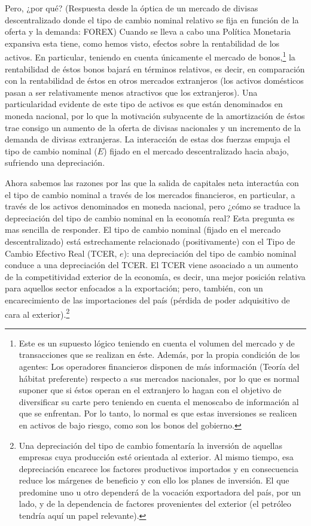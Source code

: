 \documentclass[10pt,a4paper]{article}
\begin{document}
Pero, ¿por qué? (Respuesta desde la óptica de un mercado de divisas descentralizado donde el tipo de cambio nominal relativo se fija en función de la oferta y la demanda: FOREX) Cuando se lleva a cabo una Política Monetaria expansiva esta tiene, como hemos visto, efectos sobre la rentabilidad de los activos. En particular, teniendo en cuenta únicamente el mercado de bonos,\footnote{%
    Este es un supuesto lógico teniendo en cuenta el volumen del mercado y de transacciones que se realizan en éste. Además, por la propia condición de los agentes: Los operadores financieros disponen de más información (Teoría del hábitat preferente) respecto a sus mercados nacionales, por lo que es normal suponer que si éstos operan en el extranjero lo hagan con el objetivo de diversificar su carte pero teniendo en cuenta el menoscabo de información al que se enfrentan. Por lo tanto, lo normal es que estas inversiones se realicen en activos de bajo riesgo, como son los bonos del gobierno.
} la rentabilidad de éstos bonos bajará en términos relativos, es decir, en comparación con la rentabilidad de éstos en otros mercados extranjeros (los activos domésticos pasan a ser relativamente menos atractivos que los extranjeros). Una particularidad evidente de este tipo de activos es que están denominados en moneda nacional, por lo que la motivación subyacente de la amortización de éstos trae consigo un aumento de la oferta de divisas nacionales y un incremento de la demanda de divisas extranjeras. La interacción de estas dos fuerzas empuja el tipo de cambio nominal ($E$) fijado en el mercado descentralizado hacia abajo, sufriendo una depreciación.

Ahora sabemos las razones por las que la salida de capitales neta interactúa con el tipo de cambio nominal a través de los mercados financieros, en particular, a través de los activos denominados en moneda nacional, pero ¿cómo se traduce la depreciación del tipo de cambio nominal en la economía real? Esta pregunta es mas sencilla de responder. El tipo de cambio nominal (fijado en el mercado descentralizado) está estrechamente relacionado (positivamente) con el Tipo de Cambio Efectivo Real (TCER, $e$): una depreciación del tipo de cambio nominal conduce a una depreciación del TCER. El TCER viene asoaciado a un aumento de la competitividad exterior de la economía, es decir, una mejor posición relativa para aquellos sector enfocados a la exportación; pero, también, con un encarecimiento de las importaciones del país (pérdida de poder adquisitivo de cara al exterior).\footnote{%
    Una depreciación del tipo de cambio fomentaría la inversión de aquellas empresas cuya producción esté orientada al exterior. Al mismo tiempo, esa depreciación encarece los factores productivos importados y en consecuencia reduce los márgenes de beneficio y con ello los planes de inversión. El que predomine uno u otro dependerá de la vocación exportadora del país, por un lado, y de la dependencia de factores provenientes del exterior (el petróleo tendría aquí un papel relevante).
}
\end{document}
